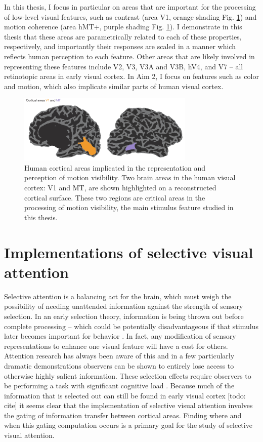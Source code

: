 In this thesis, I focus in particular on areas that are important for the processing of low-level visual features, such as contrast (area V1, orange shading Fig. \ref{fig:c0f2}) and motion coherence (area hMT+, purple shading Fig. \ref{fig:c0f2}). I demonstrate in this thesis that these areas are parametrically related to each of these properties, respectively, and importantly their responses are scaled in a manner which reflects human perception to each feature. Other areas that are likely involved in representing these features include V2, V3, V3A and V3B, hV4, and V7 -- all retinotopic areas in early visual cortex. In Aim 2, I focus on features such as color and motion, which also implicate similar parts of human visual cortex.

\begin{figure}[ht]
\centering
\includegraphics[keepaspectratio,width=0.75\textwidth]{figs_c0/brains.pdf}
\caption[Brain regions implicated in motion visibility perception]{Human cortical areas implicated in the representation and perception of motion visibility. Two brain areas in the human visual cortex: V1 and MT, are shown highlighted on a reconstructed cortical surface. These two regions are critical areas in the processing of motion visibility, the main stimulus feature studied in this thesis.}
\label{fig:c0f2}
\end{figure}

\section{Implementations of selective visual attention}

Selective attention is a balancing act for the brain, which must weigh the possibility of needing unattended information against the strength of sensory selection. In an early selection theory, information is being thrown out before complete processing -- which could be potentially disadvantageous if that stimulus later becomes important for behavior \citep{Mack1998-nq}. In fact, any modification of sensory representations to enhance one visual feature will have a cost for others. Attention research has always been aware of this and in a few particularly dramatic demonstrations \citep{Haines1991-si,Mack1998-nq,Neisser1979-mm,Simons1999-ng} observers can be shown to entirely lose access to otherwise highly salient information. These selection effects require observers to be performing a task with significant cognitive load \citep{Lavie2005-aw,Lavie2004-ub,Rees1997-hd}. Because much of the information that is selected out can still be found in early visual cortex [todo: cite] it seems clear that the implementation of selective visual attention involves the gating of information transfer between cortical areas. Finding where and when this gating computation occurs is a primary goal for the study of selective visual attention. 

